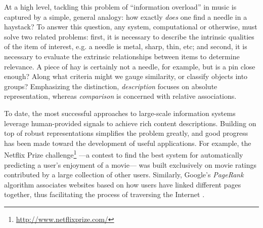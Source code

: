 At a high level, tackling this problem of ``information overload'' in music is captured by a simple, general analogy: how exactly \emph{does} one find a needle in a haystack?
To answer this question, any system, computational or otherwise, must solve two related problems:
first, it is necessary to describe the intrinsic qualities of the item of interest, e.g. a needle is metal, sharp, thin, etc;
and second, it is necessary to evaluate the extrinsic relationships between items to determine relevance.
A piece of hay is certainly not a needle, for example, but is a pin close enough?
Along what criteria might we gauge similarity, or classify objects into groups?
Emphasizing the distinction, \emph{description} focuses on absolute representation, whereas \emph{comparison} is concerned with relative associations.

To date, the most successful approaches to large-scale information systems leverage human-provided signals to achieve rich content descriptions.
Building on top of robust representations simplifies the problem greatly, and good progress has been made toward the development of useful applications.
For example, the Netflix Prize challenge\footnote{\url{http://www.netflixprize.com/}} ---a contest to find the best system for automatically predicting a user's enjoyment of a movie--- was built exclusively on movie ratings contributed by a large collection of other users.
Similarly, Google's \emph{PageRank} algorithm associates websites based on how users have linked different pages together, thus facilitating the process of traversing the Internet \cite{Page1999Pagerank}.

